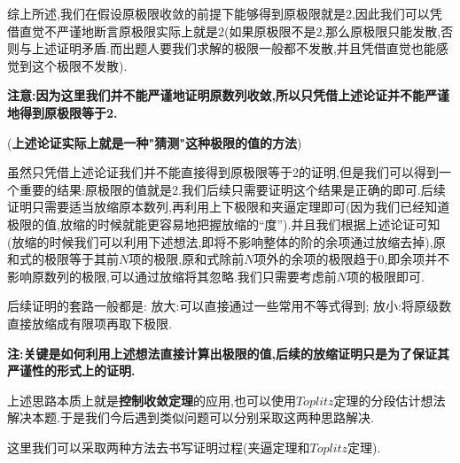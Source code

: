 \documentclass[../../main.tex]{subfiles}
\begin{document}
\begin{note}
综上所述,我们在假设原极限收敛的前提下能够得到原极限就是2,因此我们可以凭借直觉不严谨地断言原极限实际上就是2(如果原极限不是2,那么原极限只能发散,否则与上述证明矛盾.而出题人要我们求解的极限一般都不发散,并且凭借直觉也能感觉到这个极限不发散).

\textbf{注意:因为这里我们并不能严谨地证明原数列收敛,所以只凭借上述论证并不能严谨地得到原极限等于2.}

(\textbf{上述论证实际上就是一种"猜测"这种极限的值的方法})

虽然只凭借上述论证我们并不能直接得到原极限等于2的证明,但是我们可以得到一个重要的结果:原极限的值就是2.我们后续只需要证明这个结果是正确的即可.后续证明只需要适当放缩原本数列,再利用上下极限和夹逼定理即可(因为我们已经知道极限的值,放缩的时候就能更容易地把握放缩的“度”).并且我们根据上述论证可知(放缩的时候我们可以利用下述想法,即将不影响整体的阶的余项通过放缩去掉),原和式的极限等于其前$N$项的极限,原和式除前$N$项外的余项的极限趋于0,即余项并不影响原数列的极限,可以通过放缩将其忽略.我们只需要考虑前$N$项的极限即可.

后续证明的套路一般都是:
放大:可以直接通过一些常用不等式得到;
放小:将原级数直接放缩成有限项再取下极限.

\textbf{注:关键是如何利用上述想法直接计算出极限的值,后续的放缩证明只是为了保证其严谨性的形式上的证明.}
\end{note}
\begin{remark}
上述思路本质上就是\textbf{控制收敛定理}的应用,也可以使用$Toplitz$定理的分段估计想法解决本题.于是我们今后遇到类似问题可以分别采取这两种思路解决.

这里我们可以采取两种方法去书写证明过程(夹逼定理和$Toplitz$定理).
\end{remark}
\end{document}
